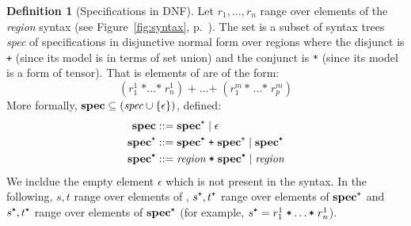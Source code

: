\documentclass[9pt]{sigplanconf}
\newcounter{block}
\theoremstyle{definition}
\newtheorem{definition}[block]{Definition}
\newcommand{\term}[1]{\texttt{#1}}
\begin{document}
\begin{definition}[Specifications in DNF]
Let $r_1, ..., r_n$ range over elements of the \textit{region}
syntax (see Figure~\ref{fig:syntax}, p.~\pageref{fig:syntax}).
The set \specDNF{} is a subset of syntax trees \textit{spec}
of specifications in disjunctive normal form over regions 
where the disjunct is \term{+} (since its model is in terms of set
union) and the conjunct is \term{*} (since its model is a form of tensor).
That is elements of \specDNF{} are of the form:
\[
(r^1_{1} \; \term{*} \ldots \term{*} \; r^1_n)\; \term{+} \; \ldots 
\term{+} \; (r^m_1 \, \term{*} \; \ldots \term{*} \; r^m_p)
\]
More formally, $\textbf{spec} \subseteq (\textit{spec} \cup \{\epsilon\})$, defined:
\begin{align*}
\specDNF{} & ::= \tySum{\specDNF} \mid \epsilon \\
\tySum{\specDNF} & ::= \tyProd{\specDNF} \; \term{+} \; \tySum{\specDNF} \mid
  \tyProd{\specDNF} \\
\tyProd{\specDNF} & ::= \textit{region} \; \term{*} \; \tyProd{\specDNF} \mid
   \textit{region}
\end{align*}
We incldue the empty element $\epsilon$ which is not present in the
syntax. 
In the following, $s, t$ range over elements of
\specDNF{}, $\tySum{s}, \tySum{t}$ range over elements of 
$\tySum{\specDNF}$ and $\tyProd{s}, \tyProd{t}$ range over elements
of $\tyProd{\specDNF}$ (for example, $\tyProd{s} = r^1_{1} \; \term{*}
\ldots \term{*} \; r^1_n$).
\end{definition}

\newcommand{\exactR}{\mathsf{exact}\;}
\newcommand{\exact}[1]{\exactR(#1)}
\newcommand{\upperB}[1]{\mathsf{upper}\;(#1)}
\end{document}
